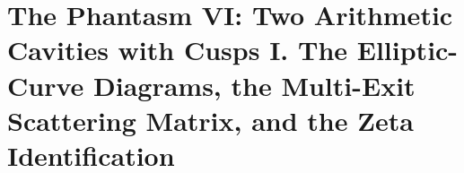
\section{The Phantasm VI: Two Arithmetic Cavities with Cusps I. The Elliptic-Curve Diagrams, the Multi-Exit Scattering Matrix, and the Zeta Identification}
\label{sec:elliptic-cavity-scattering}

